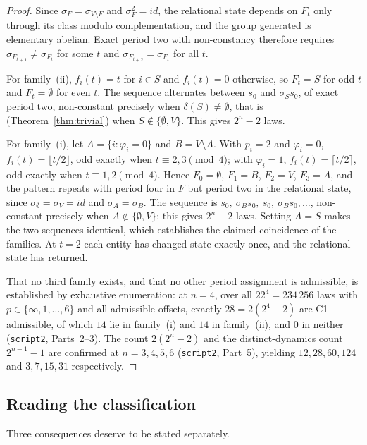 \documentclass[11pt,a4paper]{article}
\def\mathrm#1{#1}%
\begin{document}
\begin{proof}
Since $\sigma_{F}=\sigma_{V\setminus F}$ and $\sigma_F^2=\mathrm{id}$, the relational state depends on $F_t$ only through its class modulo complementation, and the group generated is elementary abelian. Exact period two with non-constancy therefore requires $\sigma_{F_{t+1}}\neq\sigma_{F_t}$ for some $t$ and $\sigma_{F_{t+2}}=\sigma_{F_t}$ for all $t$.

For family~(ii), $f_i(t)=t$ for $i\in S$ and $f_i(t)=0$ otherwise, so $F_t=S$ for odd $t$ and $F_t=\emptyset$ for even $t$. The sequence alternates between $s_0$ and $\sigma_S s_0$, of exact period two, non-constant precisely when $\delta(S)\neq\emptyset$, that is (Theorem~\ref{thm:trivial}) when $S\notin\{\emptyset,V\}$. This gives $2^n-2$ laws.

For family~(i), let $A=\{i:\varphi_i=0\}$ and $B=V\setminus A$. With $p_i=2$ and $\varphi_i=0$, $f_i(t)=\lfloor t/2\rfloor$, odd exactly when $t\equiv2,3\pmod4$; with $\varphi_i=1$, $f_i(t)=\lceil t/2\rceil$, odd exactly when $t\equiv1,2\pmod4$. Hence $F_0=\emptyset$, $F_1=B$, $F_2=V$, $F_3=A$, and the pattern repeats with period four in $F$ but period two in the relational state, since $\sigma_\emptyset=\sigma_V=\mathrm{id}$ and $\sigma_A=\sigma_B$. The sequence is $s_0,\ \sigma_B s_0,\ s_0,\ \sigma_B s_0,\dots$, non-constant precisely when $A\notin\{\emptyset,V\}$; this gives $2^n-2$ laws. Setting $A=S$ makes the two sequences identical, which establishes the claimed coincidence of the families. At $t=2$ each entity has changed state exactly once, and the relational state has returned.

That no third family exists, and that no other period assignment is admissible, is established by exhaustive enumeration: at $n=4$, over all $22^4=234\,256$ laws with $p\in\{\infty,1,\dots,6\}$ and all admissible offsets, exactly $28=2(2^4-2)$ are C1-admissible, of which $14$ lie in family~(i) and $14$ in family~(ii), and $0$ in neither (\texttt{script2}, Parts~2--3). The count $2(2^n-2)$ and the distinct-dynamics count $2^{n-1}-1$ are confirmed at $n=3,4,5,6$ (\texttt{script2}, Part~5), yielding $12,28,60,124$ and $3,7,15,31$ respectively.
\end{proof}

\subsection{Reading the classification}

Three consequences deserve to be stated separately.
\end{document}

